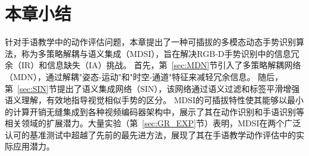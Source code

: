 \section{本章小结}
针对手语教学中的动作评估问题，本章提出了一种可插拔的多模态动态手势识别算法，称为多策略解耦与语义集成（MDSI），旨在解决RGB-D手势识别中的信息冗余（IR）和信息缺失（IA）挑战。
首先，第~\ref{sec:MDN}节引入了多策略解耦网络（MDN），通过解耦"姿态-运动"和"时空-通道"特征来减轻冗余信息。
随后，第~\ref{sec:SIN}节提出了语义集成网络（SIN），该网络通过语义过滤和标签平滑增强语义理解，有效地指导视觉相似手势的区分。
MDSI的可插拔特性使其能够以最小的计算开销无缝集成到各种视频编码器架构中，展示了其在动作识别和手语识别等相关领域的扩展潜力。大量实验（第~\ref{sec:GR_EXP}节）表明，MDSI在两个广泛认可的基准测试中超越了先前的最先进方法，展现了其在手语教学动作评估中的实际应用潜力。




